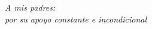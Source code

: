 \documentclass[../main.tex]{subfiles}
\begin{document}
    \chapter*{}
    \begin{flushright}
        \textit{A mis padres: \\
            por su apoyo constante e incondicional }
    \end{flushright}
    
\end{document}
